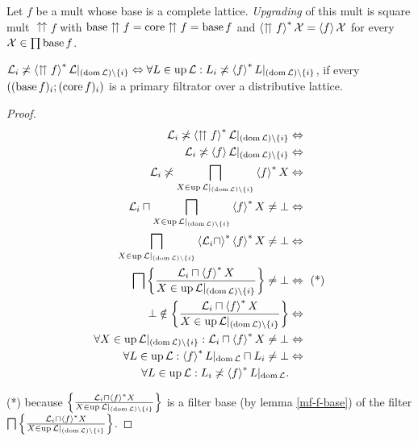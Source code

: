 \begin{defn}
Let $f$ be a mult whose base is a complete lattice. \emph{Upgrading}
of this mult is square mult $\upuparrows f$ with $\operatorname{base}\upuparrows f=\operatorname{core}\upuparrows f=\operatorname{base} f$
and $\left\langle \upuparrows f\right\rangle ^{\ast}\mathcal{X}=\left\langle f\right\rangle\mathcal{X}$ for
every $\mathcal{X}\in\prod\operatorname{base} f$.\end{defn}
\begin{lem}
$\mathcal{L}_{i}\not\asymp\left\langle \upuparrows f\right\rangle ^{\ast}\mathcal{L}|_{(\operatorname{dom}\mathcal{L})\setminus\{i\}}\Leftrightarrow\forall L\in\operatorname{up}\mathcal{L}:L_{i}\not\asymp\left\langle f\right\rangle ^{\ast}L|_{(\operatorname{dom}\mathcal{L})\setminus\{i\}}$,
if every $((\operatorname{base} f)_{i};(\operatorname{core} f)_{i})$ is a primary filtrator over
a distributive lattice.\end{lem}
\begin{proof}
~
\begin{align*}
\mathcal{L}_{i}\not\asymp\left\langle \upuparrows f\right\rangle ^{\ast}\mathcal{L}|_{(\operatorname{dom}\mathcal{L})\setminus\{i\}} & \Leftrightarrow\\
\mathcal{L}_{i}\not\asymp\left\langle f\right\rangle\mathcal{L}|_{(\operatorname{dom}\mathcal{L})\setminus\{i\}} & \Leftrightarrow\\
\mathcal{L}_{i}\not\asymp\bigsqcap_{X\in\operatorname{up}\mathcal{L}|_{(\operatorname{dom}\mathcal{L})\setminus\{i\}}}\left\langle f\right\rangle ^{\ast}X & \Leftrightarrow\\
\mathcal{L}_{i}\sqcap\bigsqcap_{X\in\operatorname{up}\mathcal{L}|_{(\operatorname{dom}\mathcal{L})\setminus\{i\}}}\left\langle f\right\rangle ^{\ast}X\ne\bot & \Leftrightarrow\\
\bigsqcap_{X\in\operatorname{up}\mathcal{L}|_{(\operatorname{dom}\mathcal{L})\setminus\{i\}}}\left\langle \mathcal{L}_{i}\sqcap\right\rangle ^{\ast}\left\langle f\right\rangle ^{\ast}X\ne\bot & \Leftrightarrow\\
\bigsqcap\left\{ \frac{\mathcal{L}_{i}\sqcap\left\langle f\right\rangle ^{\ast}X}{X\in\operatorname{up}\mathcal{L}|_{(\operatorname{dom}\mathcal{L})\setminus\{i\}}}\right\}\ne\bot & \Leftrightarrow\text{ (*)}\\
\bot\notin\left\{ \frac{\mathcal{L}_{i}\sqcap\left\langle f\right\rangle ^{\ast}X}{X\in\operatorname{up}\mathcal{L}|_{(\operatorname{dom}\mathcal{L})\setminus\{i\}}}\right\} & \Leftrightarrow\\
\forall X\in\operatorname{up}\mathcal{L}|_{(\operatorname{dom}\mathcal{L})\setminus\{i\}} : \mathcal{L}_{i}\sqcap\left\langle f\right\rangle ^{\ast}X \ne \bot & \Leftrightarrow\\
\forall L\in\operatorname{up}\mathcal{L}:\left\langle f\right\rangle ^{\ast}L|_{\operatorname{dom}\mathcal{L}}\sqcap L_{i}\ne\bot & \Leftrightarrow\\
\forall L\in\operatorname{up}\mathcal{L}:L_{i}\not\asymp\left\langle f\right\rangle ^{\ast}L|_{\operatorname{dom}\mathcal{L}}.
\end{align*}


({*}) because $\left\{ \frac{\mathcal{L}_{i}\sqcap\left\langle f\right\rangle ^{\ast}X}{X\in\operatorname{up}\mathcal{L}|_{(\operatorname{dom}\mathcal{L})\setminus\{i\}}}\right\}$
is a filter base (by lemma \ref{mf-f-base}) of the filter $\bigsqcap\left\{ \frac{\mathcal{L}_{i}\sqcap\left\langle f\right\rangle ^{\ast}X}{X\in\operatorname{up}\mathcal{L}|_{(\operatorname{dom}\mathcal{L})\setminus\{i\}}}\right\}$.\end{proof}
